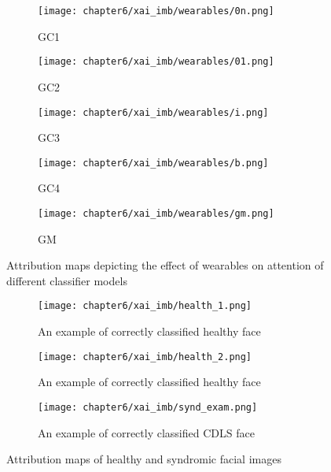 \documentclass[../report.tex]{subfiles}
\begin{document}
\begin{figure}[H]
	\begin{subfigure}[t]{1\textwidth}
		\centering
		\texttt{[image: chapter6/xai\_imb/wearables/0n.png]}
		\caption{GC1}
	\end{subfigure}
	\begin{subfigure}[t]{1\textwidth}
		\centering
		\texttt{[image: chapter6/xai\_imb/wearables/01.png]}
		\caption{GC2}
	\end{subfigure}
	\begin{subfigure}[t]{1\textwidth}
		\centering
		\texttt{[image: chapter6/xai\_imb/wearables/i.png]}
		\caption{GC3}
		
	\end{subfigure}
	\begin{subfigure}[t]{1\textwidth}
		\centering
		\texttt{[image: chapter6/xai\_imb/wearables/b.png]}
		\caption{GC4}
	\end{subfigure}
	\begin{subfigure}[t]{1\textwidth}
		\centering
		\texttt{[image: chapter6/xai\_imb/wearables/gm.png]}
		\caption{GM}
		\label{fig_wearable_gm}
	\end{subfigure}
	\caption{Attribution maps depicting the effect of wearables on attention of different classifier models}
	\label{fig_gm_wearables}
\end{figure}

\begin{figure}[H]
	\begin{subfigure}[t]{1\textwidth}
		\centering
		\texttt{[image: chapter6/xai\_imb/health\_1.png]}
		\caption{An example of correctly classified healthy face}
		
	\end{subfigure}
	\begin{subfigure}[t]{1\textwidth}
		\centering
		\texttt{[image: chapter6/xai\_imb/health\_2.png]}
		\caption{An example of correctly classified healthy face}
		
	\end{subfigure}
	\begin{subfigure}[t]{1\textwidth}
		\centering
		\texttt{[image: chapter6/xai\_imb/synd\_exam.png]}
		\caption{An example of correctly classified CDLS face}
	\end{subfigure}
	\caption{Attribution maps of healthy and syndromic facial images}
	\label{fig_health_syn_exam}
\end{figure}
\end{document}
